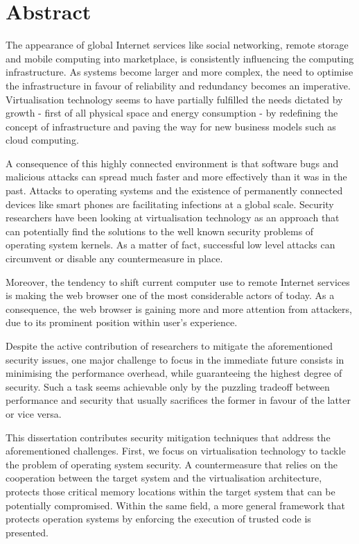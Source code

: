 \section*{Abstract}

The appearance of global Internet services like social networking, remote storage and mobile computing into marketplace, is consistently influencing the computing infrastructure. As systems become larger and more complex, the need to optimise the infrastructure in favour of reliability and redundancy becomes an imperative. Virtualisation technology seems to have partially fulfilled the needs dictated by growth - first of all physical space and energy consumption - by redefining the concept of infrastructure and paving the way for new business models such as cloud computing.

A consequence of this highly connected environment is that software bugs and malicious attacks can spread much faster and more effectively than it was in the past. Attacks to operating systems and the existence of permanently connected devices like smart phones are facilitating infections at a global scale. 
Security researchers have been looking at virtualisation technology as an approach that can potentially find the solutions to the well known security problems of operating system kernels. As a matter of fact, successful low level attacks can circumvent or disable any countermeasure in place.

Moreover, the tendency to shift current computer use to remote Internet services is making the web browser one of the most considerable actors of today. As a consequence, the web browser is gaining more and more attention from attackers, due to its prominent position within user's experience.

Despite the active contribution of researchers to mitigate the aforementioned security issues, one major challenge to focus in the immediate future consists in minimising the performance overhead, while guaranteeing the highest degree of security. Such a task seems achievable only by the puzzling tradeoff between performance and security that usually sacrifices the former in favour of the latter or vice versa.

This dissertation contributes security mitigation techniques that address the aforementioned challenges. First, we focus on virtualisation technology to tackle the problem of operating system security. A countermeasure that relies on the cooperation between the target system and the virtualisation architecture, protects those critical memory locations within the target system that can be potentially compromised. Within the same field, a more general framework that protects operation systems by enforcing the execution of trusted code is presented.

